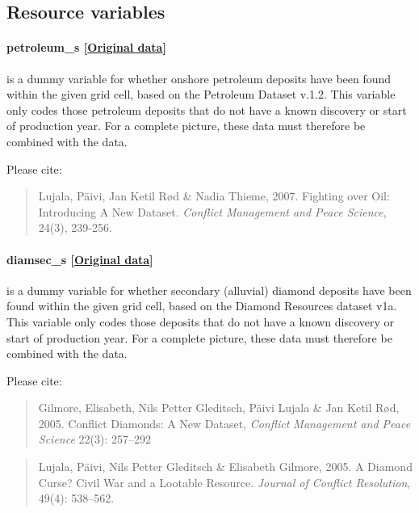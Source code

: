 \documentclass[]{book}
\begin{document}
\subsection{Resource variables}\label{resource-variables}

\paragraph{petroleum\_s
{[}\href{https://www.prio.org/Data/Geographical-and-Resource-Datasets/Petroleum-Dataset/Petroleum-Dataset-v-12/}{Original
data}{]}}\label{petroleum-s}

is a dummy variable for whether onshore petroleum deposits have been
found within the given grid cell, based on the Petroleum Dataset v.1.2.
This variable only codes those petroleum deposits that do not have a
known discovery or start of production year. For a complete picture,
these data must therefore be combined with the 
data.

Please cite:

\begin{quote}
Lujala, Päivi, Jan Ketil Rød \& Nadia Thieme, 2007. Fighting over Oil:
Introducing A New Dataset. \emph{Conflict Management and Peace Science},
24(3), 239-256.
\end{quote}

\paragraph{diamsec\_s
{[}\href{https://www.prio.org/Data/Geographical-and-Resource-Datasets/Diamond-Resources/}{Original
data}{]}}\label{diamsec-s}

is a dummy variable for whether secondary (alluvial) diamond deposits
have been found within the given grid cell, based on the Diamond
Resources dataset v1a. This variable only codes those deposits that do
not have a known discovery or start of production year. For a complete
picture, these data must therefore be combined with the
 data.

Please cite:

\begin{quote}
Gilmore, Elisabeth, Nils Petter Gleditsch, Päivi Lujala \& Jan Ketil
Rød, 2005. Conflict Diamonds: A New Dataset, \emph{Conflict Management
and Peace Science} 22(3): 257--292
\end{quote}

\begin{quote}
Lujala, Päivi, Nils Petter Gleditsch \& Elisabeth Gilmore, 2005. A
Diamond Curse? Civil War and a Lootable Resource. \emph{Journal of
Conflict Resolution}, 49(4): 538--562.
\end{quote}
\end{document}
